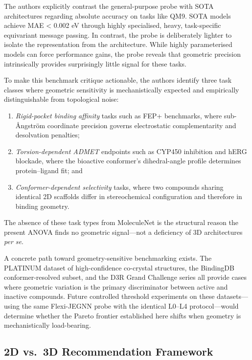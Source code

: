 \documentclass[pdflatex,sn-vancouver-num]{sn-jnl}%
\theoremstyle{thmstyleone}%
\theoremstyle{thmstyletwo}%
\theoremstyle{thmstylethree}%
\begin{document}
The authors explicitly contrast the general-purpose probe with SOTA architectures regarding absolute accuracy on tasks like QM9. SOTA models achieve MAE < 0.002 eV through highly specialised, heavy, task-specific equivariant message passing. In contrast, the probe is deliberately lighter to isolate the representation from the architecture. While highly parameterised models can force performance gains, the probe reveals that geometric precision intrinsically provides surprisingly little signal for these tasks.

To make this benchmark critique actionable, the authors identify three task classes
where geometric sensitivity is mechanistically expected and empirically
distinguishable from topological noise:
%
\begin{enumerate}[label=(\roman*)]
  \item \emph{Rigid-pocket binding affinity} tasks such as FEP+ benchmarks,
  where sub-\AA{}ngstr\"{o}m coordinate precision governs electrostatic
  complementarity and desolvation penalties;
  \item \emph{Torsion-dependent ADMET} endpoints such as CYP450 inhibition
  and hERG blockade, where the bioactive conformer's dihedral-angle profile
  determines protein--ligand fit; and
  \item \emph{Conformer-dependent selectivity} tasks, where two compounds
  sharing identical 2D scaffolds differ in stereochemical configuration and
  therefore in binding geometry.
\end{enumerate}
%
The absence of these task types from MoleculeNet is the structural reason
the present ANOVA finds no geometric signal---not a deficiency of 3D architectures
\emph{per se}.

A concrete path toward geometry-sensitive benchmarking exists.  The
PLATINUM dataset of high-confidence co-crystal structures, the BindingDB
conformer-resolved subset, and the D3R Grand Challenge series all provide
cases where geometric variation is the primary discriminator between active
and inactive compounds.  Future controlled threshold experiments on these
datasets---using the same Flexi-JEGNN probe with the identical L0--L4
protocol---would determine whether the Pareto frontier established here
shifts when geometry is mechanistically load-bearing.

\subsection{2D vs.\ 3D Recommendation Framework}
\label{ssec:recommendation}
\end{document}
